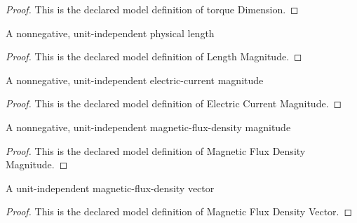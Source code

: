 \begin{proof}
  This is the declared model definition of torque Dimension.
\end{proof}
\begin{definition}
  \label{def:physics:phyx-mini-0947:phyxminiproblems-problemphyxmini0947-lengthmagnitude}
  A nonnegative, unit-independent physical length
\end{definition}
\begin{proof}
  This is the declared model definition of Length Magnitude.
\end{proof}
\begin{definition}
  \label{def:physics:phyx-mini-0947:phyxminiproblems-problemphyxmini0947-electriccurrentmagnitude}
  A nonnegative, unit-independent electric-current magnitude
\end{definition}
\begin{proof}
  This is the declared model definition of Electric Current Magnitude.
\end{proof}
\begin{definition}
  \label{def:physics:phyx-mini-0947:phyxminiproblems-problemphyxmini0947-magneticfluxdensitymagnitude}
  A nonnegative, unit-independent magnetic-flux-density magnitude
\end{definition}
\begin{proof}
  This is the declared model definition of Magnetic Flux Density Magnitude.
\end{proof}
\begin{definition}
  \label{def:physics:phyx-mini-0947:phyxminiproblems-problemphyxmini0947-magneticfluxdensityvector}
  A unit-independent magnetic-flux-density vector
\end{definition}
\begin{proof}
  This is the declared model definition of Magnetic Flux Density Vector.
\end{proof}
